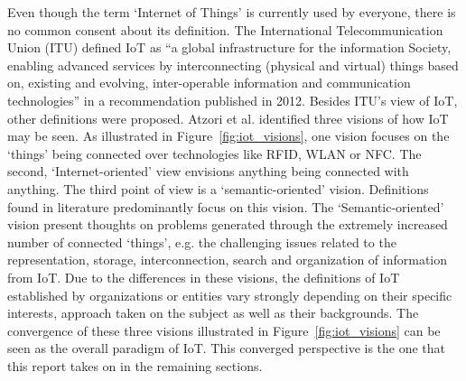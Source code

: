 	Even though the term `Internet of Things' is currently used by everyone, there is no common consent about its definition. The International Telecommunication Union (ITU) defined IoT as ``a global infrastructure for the information Society, enabling advanced services by interconnecting (physical and virtual) things based on, existing and evolving, inter-operable information and communication technologies'' \cite[p.~1]{itu} in a recommendation published in 2012. Besides ITU's view of IoT, other definitions were proposed. Atzori et al. \cite{atzori} identified three visions of how IoT may be seen. As illustrated in Figure~\ref{fig:iot_visions}, one vision focuses on the `things' being connected over technologies like RFID, WLAN or NFC. The second, `Internet-oriented' view envisions anything being connected with anything. The third point of view is a `semantic-oriented' vision. Definitions found in literature predominantly focus on this vision. The `Semantic-oriented' vision present thoughts on problems generated through the extremely increased number of connected `things', e.g. the challenging issues related to the representation, storage, interconnection, search and organization of information from IoT. Due to the differences in these visions, the definitions of IoT established by organizations or entities vary strongly depending on their specific interests, approach taken on the subject as well as their backgrounds. The convergence of these three visions illustrated in Figure~\ref{fig:iot_visions} can be seen as the overall paradigm of IoT. This converged perspective is the one that this report takes on in the remaining sections. 

